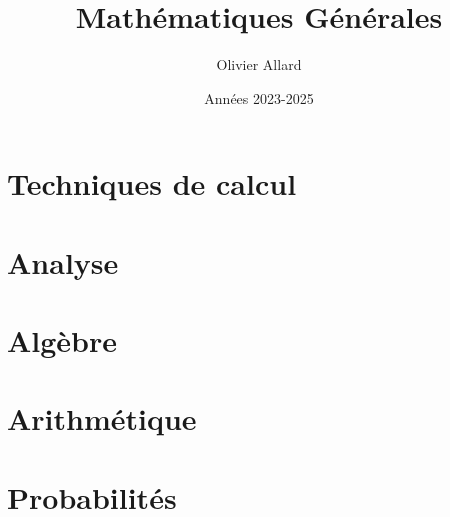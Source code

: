 \documentclass[12pt, a4paper, twoside]{report}
\author{Olivier Allard}
\title{Mathématiques Générales}
\date{Années 2023-2025}
\begin{document}


\tableofcontents

\part{Techniques de calcul}



\part{Analyse}






\part{Algèbre}





\part{Arithmétique}



\part{Probabilités}


\end{document}
